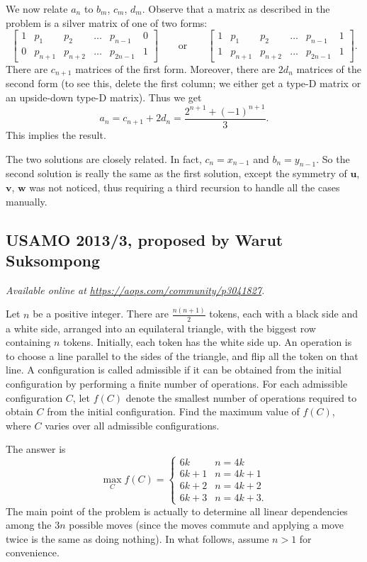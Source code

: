 \documentclass[11pt]{scrartcl}
\begin{document}
We now relate $a_n$ to $b_m$, $c_m$, $d_m$.
Observe that a matrix as described in the problem is a silver
matrix of one of two forms:
\[
  \begin{bmatrix}
    1 & p_1 & p_2 & \dots & p_{n-1} & 0 \\
    0 & p_{n+1} & p_{n+2} & \dots & p_{2n-1} & 1
  \end{bmatrix}
  \qquad
  \text{or}\qquad
  \begin{bmatrix}
    1 & p_1 & p_2 & \dots & p_{n-1} & 1 \\
    1 & p_{n+1} & p_{n+2} & \dots & p_{2n-1} & 1
  \end{bmatrix}.
\]
There are $c_{n+1}$ matrices of the first form.
Moreover, there are $2d_n$ matrices of the second form
(to see this, delete the first column;
we either get a type-D matrix
or an upside-down type-D matrix).
Thus we get
\[ a_n = c_{n+1} + 2d_n
  = \frac{2^{n+1} + (-1)^{n+1}}{3}. \]
This implies the result.

\begin{remark*}
  The two solutions are closely related.
  In fact, $c_n = x_{n-1}$ and $b_n = y_{n-1}$.
  So the second solution is really the same as the first solution,
  except the symmetry of $\mathbf u$, $\mathbf v$, $\mathbf w$ was not noticed,
  thus requiring a third recursion to handle all the cases manually.
\end{remark*}
\pagebreak

\subsection{USAMO 2013/3, proposed by Warut Suksompong}
\textsl{Available online at \url{https://aops.com/community/p3041827}.}
\begin{mdframed}[style=mdpurplebox,frametitle={Problem statement}]
Let $n$ be a positive integer.
There are $\tfrac{n(n+1)}{2}$ tokens,
each with a black side and a white side,
arranged into an equilateral triangle,
with the biggest row containing $n$ tokens.
Initially, each token has the white side up.
An operation is to choose a line parallel to the sides of the triangle,
and flip all the token on that line.
A configuration is called admissible if it can be obtained from the
initial configuration by performing a finite number of operations.
For each admissible configuration $C$,
let $f(C)$ denote the smallest number of operations required to
obtain $C$ from the initial configuration.
Find the maximum value of $f(C)$,
where $C$ varies over all admissible configurations.
\end{mdframed}
The answer is
\[
  \max_C f(C) =
  \begin{cases}
    6k & n = 4k \\
    6k+1 & n = 4k+1 \\
    6k+2 & n = 4k+2 \\
    6k+3 & n = 4k+3.
  \end{cases}
\]
The main point of the problem is actually to determine
all linear dependencies among the $3n$ possible moves
(since the moves commute and applying a move twice
is the same as doing nothing).
In what follows, assume $n > 1$ for convenience.
\end{document}
